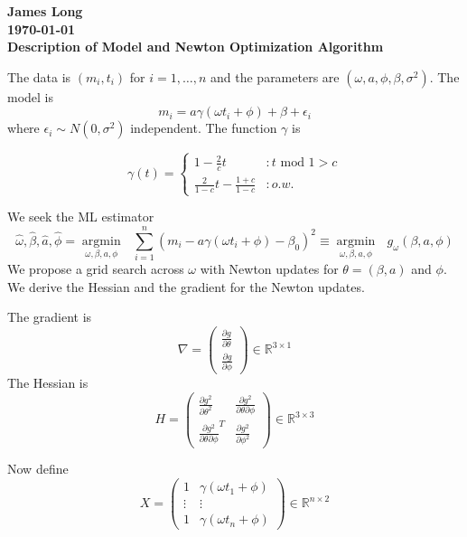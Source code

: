 \documentclass[12pt]{article}
\title{}
\date{}
\author{}
\newcommand{\argmin}[1]{\underset{#1}{\operatorname{argmin}}\text{ }}
\begin{document}
\noindent
\textbf{James Long}\\
\textbf{\today}\\
\textbf{Description of Model and Newton Optimization Algorithm}

The data is $(m_i,t_i)$ for $i=1,\ldots,n$ and the parameters are $(\omega,a,\phi,\beta,\sigma^2)$. The model is
\begin{equation*}
m_i = a\gamma(\omega t_i + \phi) + \beta + \epsilon_i
\end{equation*}
where $\epsilon_i \sim N(0,\sigma^2)$ independent. The function $\gamma$ is 

\begin{equation*}
  \gamma(t) =    \left\{
  \begin{array}{lr}
    1 - \frac{2}{c}t &:  t \text{ mod } 1 > c\\ 
    \frac{2}{1-c}t - \frac{1+c}{1-c}  &: o.w.
  \end{array} \right.
\end{equation*}

We seek the ML estimator
\begin{equation*}
\widehat{\omega},\widehat{\beta},\widehat{a},\widehat{\phi} = \argmin{\omega,\beta,a,\phi} \sum_{i=1}^n (m_i - a\gamma(\omega t_i + \phi) - \beta_0)^2 \equiv \argmin{\omega,\beta,a,\phi} g_\omega(\beta,a,\phi)
\end{equation*}
We propose a grid search across $\omega$ with Newton updates for $\theta = (\beta,a)$ and $\phi$. We derive the Hessian and the gradient for the Newton updates. 

The gradient is
\begin{equation*}
\nabla = \begin{pmatrix}
\frac{\partial g}{\partial \theta} \\
\frac{\partial g}{\partial \phi}
\end{pmatrix} \in \mathbb{R}^{3 \times 1}
\end{equation*}
The Hessian is
\begin{equation*}
H = \begin{pmatrix}
\frac{\partial g^2}{\partial \theta^2} & \frac{\partial g^2}{\partial \theta \partial \phi} \\
\frac{\partial g^2}{\partial \theta \partial \phi}^T  & \frac{\partial g^2}{\partial \phi^2} 
\end{pmatrix} \in \mathbb{R}^{3 \times 3}
\end{equation*}



Now define
\begin{equation*}
X = \begin{pmatrix}
1 & \gamma(\omega t_1 + \phi) \\
\vdots & \vdots\\
1 & \gamma(\omega t_n + \phi)
\end{pmatrix} \in \mathbb{R}^{n \times 2}
\end{equation*}
\end{document}

